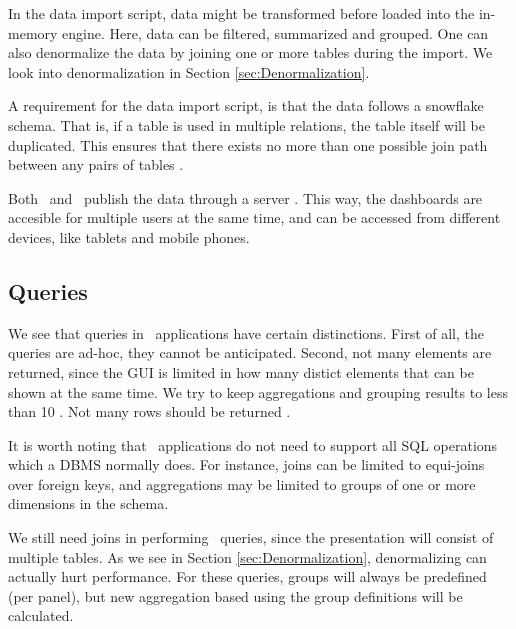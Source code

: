In the data import script, data might be transformed before loaded into the in-memory engine. Here, data can be filtered, summarized and grouped. One can also denormalize the data by joining one or more tables during the import. We look into denormalization in Section \ref{sec:Denormalization}.

A requirement for the data import script, is that the data follows a snowflake schema. That is, if a table is used in multiple relations, the table itself will be duplicated. This ensures that there exists no more than one possible join path between any pairs of tables \cite{noauthor_undated-js}. 

Both \qlikview~and \tableau~publish the data through a server \cite{Kamkolkar2015-iq, Qlik2011-ef}. This way, the dashboards are accesible for multiple users at the same time, and can be accessed from different devices, like tablets and mobile phones.


\subsection{Queries}
\label{sub:Queries}
We see that queries in \bd~applications have certain distinctions. First of all, the queries are ad-hoc, they cannot be anticipated. Second, not many elements are returned, since the GUI is limited in how many distict elements that can be shown at the same time.  We try to keep aggregations and grouping results to less than 10 \cite{Johnson2008-cp}. Not many rows should be returned \cite{Ferrari2012-hm}.

It is worth noting that \bd~applications do not need to support all SQL operations which a DBMS normally does. For instance, joins can be limited to equi-joins over foreign keys, and aggregations may be limited to groups of one or more dimensions in the schema.

We still need joins in performing \bd~queries, since the presentation will consist of multiple tables. As we see in Section \ref{sec:Denormalization}, denormalizing can actually hurt performance. For these queries, groups will always be predefined (per panel), but new aggregation based using the group definitions will be calculated.

